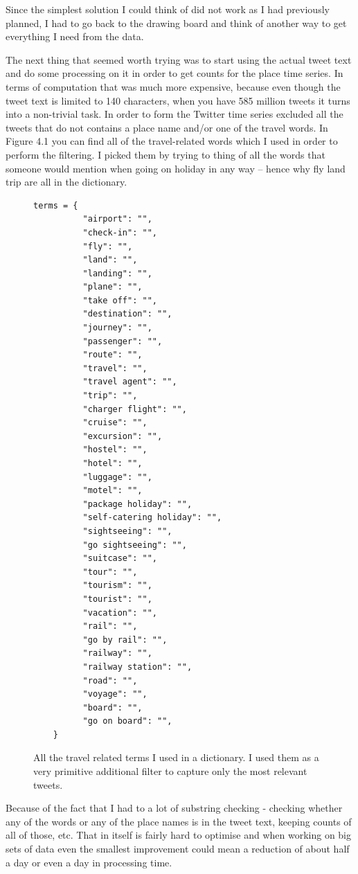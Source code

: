 \documentclass[minf,twoside,singlespacing,parskip,frontabs]{infthesis}
\begin{document}
Since the simplest solution I could think of did not work as I had previously planned, I had to go back to the drawing board and think of another way to get everything I need from the data. 


The next thing that seemed worth trying was to start using the actual tweet text and do some processing on it in order to get counts for the place time series. In terms of computation that was much more expensive, because even though the tweet text is limited to 140 characters, when you have 585 million tweets it turns into a non-trivial task. In order to form the Twitter time series excluded all the tweets that do not contains a place name and/or one of the travel words. In Figure 4.1 you can find all of the travel-related words which I used in order to perform the filtering. I picked them by trying to thing of all the words that someone would mention when going on holiday in any way -- hence why fly land trip are all in the dictionary. 


\begin{figure}[]
\begin{center}
\begin{lstlisting}
terms = {
          "airport": "",
          "check-in": "",
          "fly": "",
          "land": "",
          "landing": "",
          "plane": "",
          "take off": "",
          "destination": "",
          "journey": "",
          "passenger": "",
          "route": "",
          "travel": "",
          "travel agent": "",
          "trip": "",
          "charger flight": "",
          "cruise": "",
          "excursion": "",
          "hostel": "",
          "hotel": "",
          "luggage": "",
          "motel": "",
          "package holiday": "",
          "self-catering holiday": "",
          "sightseeing": "",
          "go sightseeing": "",
          "suitcase": "",
          "tour": "",
          "tourism": "",
          "tourist": "",
          "vacation": "",
          "rail": "",
          "go by rail": "",
          "railway": "",
          "railway station": "",
          "road": "",
          "voyage": "",
          "board": "",
          "go on board": "",
	}
\end{lstlisting}
\end{center}
\caption{All the travel related terms I used in a dictionary. I used them as a very primitive additional filter to capture only the most relevant tweets. }
\end{figure}


Because of the fact that I had to a lot of substring checking - checking whether any of the words or any of the place names is in the tweet text, keeping counts of all of those, etc. That in itself is fairly hard to optimise and when working on big sets of data even the smallest improvement could mean a reduction of about half a day or even a day in processing time. 
\end{document}

